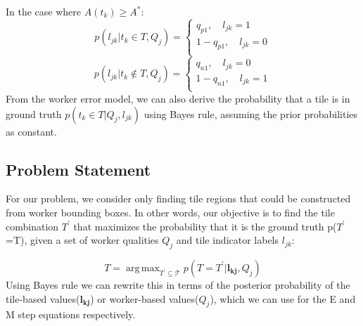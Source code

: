 \documentclass[letterpaper]{article} %
\DeclareMathOperator*{\argmax}{arg\,max}
\begin{document}
\begin{enumerate}
In the case where $A(t_k)\geq A^*$: 
\begin{equation}
p(l_{jk}|t_k\in T,Q_j) = \begin{cases}
               q_{p1}, \quad l_{jk}=1  \\
               1-q_{p1}, \quad l_{jk}=0  \\
            \end{cases}
\end{equation}
\begin{equation}
p(l_{jk}|t_k\notin T,Q_j) = \begin{cases}
               q_{n1}, \quad l_{jk}=0  \\
               1-q_{n1}, \quad l_{jk}=1  \\
            \end{cases}
\end{equation}
From the worker error model, we can also derive the probability that a tile is in ground truth $p(t_k\in T|Q_j, l_{jk})$ using Bayes rule, assuming the prior probabilities as constant.

\end{enumerate}
\subsection{Problem Statement}
\par For our problem, we consider only finding tile regions that could be constructed from worker bounding boxes. In other words, our objective is to find the tile combination $T^\prime$ that maximizes the probability that it is the ground truth p($T^\prime$=T), given a set of worker qualities $Q_j$ and tile indicator labels $l_{jk}$: 

\begin{equation}
T = \argmax_{T^\prime \subseteq \mathcal{T}}p(T=T^\prime |  \mathbf{l_{kj}},Q_j)
\label{objective}
\end{equation}
Using Bayes rule we can rewrite this in terms of the posterior probability of the tile-based values($\mathbf{l_{kj}}$) or worker-based values($Q_{j}$), which we can use for the E and M step equations respectively. 
\end{document}
